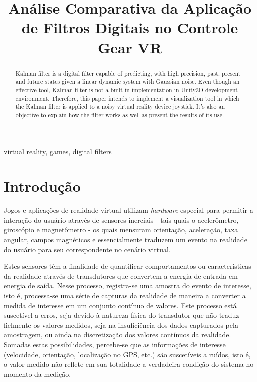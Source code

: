 \documentclass[conference]{IEEEtran}
\begin{document}
\title{Análise Comparativa da Aplicação de Filtros Digitais no Controle Gear VR}

\author{
}

\maketitle

\begin{abstract}
Kalman filter is a digital filter capable of predicting, with high precision, past, present and future states given a linear dynamic system with Gaussian noise. Even though an effective tool, Kalman filter is not a built-in implementation in Unity3D development environment. Therefore, this paper intends to implement  a visualization tool in which the Kalman filter is applied to a noisy virtual reality device joystick. It's also an objective to explain how the filter works as well as present the results of its use.
\end{abstract}

\begin{IEEEkeywords}
virtual reality, games, digital filters
\end{IEEEkeywords}

\section{Introdução}
Jogos e aplicações de realidade virtual utilizam \textit{hardware} especial para permitir a interação do usuário através de sensores inerciais - tais quais o acelerômetro, giroscópio e magnetômetro - os quais mensuram orientação, aceleração, taxa angular, campos magnéticos e essencialmente traduzem um evento na realidade do usuário para seu correspondente no cenário virtual.

Estes sensores têm a finalidade de quantificar comportamentos ou características da realidade através de transdutores que convertem a energia de entrada em energia de saída. Nesse processo, registra-se uma amostra do evento de interesse, isto é, processa-se uma série de capturas da realidade de maneira a converter a medida de interesse em um conjunto contínuo de valores. Este processo está suscetível a erros, seja devido à natureza física do transdutor que não traduz fielmente os valores medidos, seja na insuficiência dos dados capturados pela amostragem, ou ainda na discretização dos valores contínuos da realidade. Somadas estas possibilidades, percebe-se que as informações de interesse (velocidade, orientação, localização no GPS, etc.) são suscetíveis a ruídos, isto é, o valor medido não reflete em sua totalidade a verdadeira condição do sistema no momento da medição.
\end{document}
